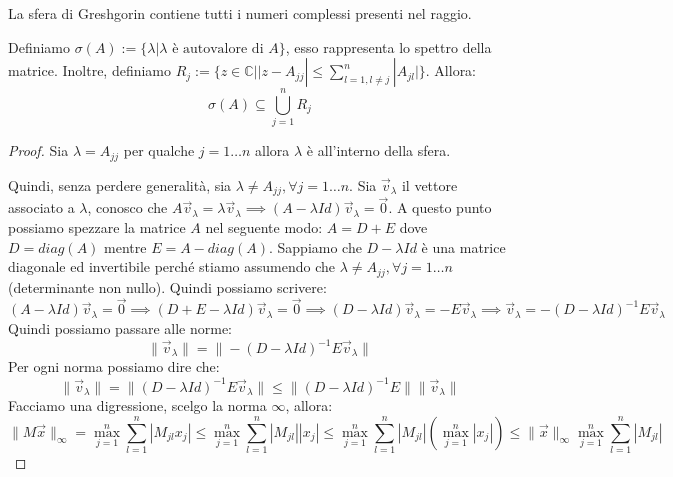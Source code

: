 La sfera di Greshgorin contiene tutti i numeri complessi presenti nel raggio.

\begin{teorema} 
    Definiamo $\sigma(A):=\{\lambda | \lambda\text{ è autovalore di }A\}$, esso
    rappresenta lo spettro della matrice. Inoltre, definiamo $R_j:=\{z\in \mathbb{C}|
        |z-A_{jj}| \leq \sum_{l=1, l\neq j}^{n} |A_{jl}|\}$.
    Allora:
    \begin{equation*}
        \sigma(A) \subseteq \bigcup_{j=1}^{n} R_j
    \end{equation*}
    \begin{proof}
        Sia $\lambda = A_{jj}$ per qualche $j = 1 \dots n$ allora $\lambda$ è
        all'interno della sfera.

        Quindi, senza perdere generalità, sia $\lambda \neq A_{jj}, \forall j= 1 \dots n$.
        Sia $\vec{v}_\lambda$ il vettore associato a $\lambda$, conosco che
        $A \vec{v}_\lambda = \lambda \vec{v}_\lambda \implies (A - \lambda Id)
            \vec{v}_\lambda = \vec{0}$. A questo punto possiamo spezzare la matrice
        $A$ nel seguente modo: $A = D + E$ dove $D = diag(A)$ mentre $E = A - diag(A)$.
        Sappiamo che $D - \lambda Id$ è una matrice diagonale ed invertibile
        perché stiamo assumendo che $\lambda \neq A_{jj}, \forall j = 1 \dots n$ (determinante non nullo).
        Quindi possiamo scrivere:
        \begin{equation*}
            (A - \lambda Id)\vec{v}_\lambda = \vec{0} \implies (D + E - \lambda
            Id)\vec{v}_\lambda = \vec{0} \implies (D - \lambda Id)\vec{v}_\lambda
            = - E\vec{v}_\lambda \implies \vec{v}_\lambda = -(D - \lambda Id)^{-1}
            E\vec{v}_\lambda
        \end{equation*}
        Quindi possiamo passare alle norme:
        \begin{equation*}
            \|\vec{v}_\lambda\| = \|-(D - \lambda Id)^{-1}E\vec{v}_\lambda\|
        \end{equation*}
        Per ogni norma possiamo dire che:
        \begin{equation*}
            \|\vec{v}_\lambda\| = \|(D - \lambda Id)^{-1}E\vec{v}_\lambda\| \leq
            \|(D - \lambda Id)^{-1}E\| \|\vec{v}_\lambda\|
        \end{equation*}
        Facciamo una digressione, scelgo la norma $\infty$, allora:
        \begin{equation*}
            \|M\vec{x}\|_\infty = \max_{j = 1}^n \sum_{l = 1}^{n}|M_{jl}x_j| \leq
            \max_{j = 1}^n\sum_{l = 1}^{n}|M_{jl}||x_j|\leq \max_{j = 1}^n
            \sum_{l = 1}^{n}|M_{jl}|(\max_{j = 1}^n|x_j|)\leq \|\vec{x}\|_\infty
            \max_{j = 1}^n\sum_{l = 1}^{n}|M_{jl}|
        \end{equation*}


\end{proof}
\end{teorema}
